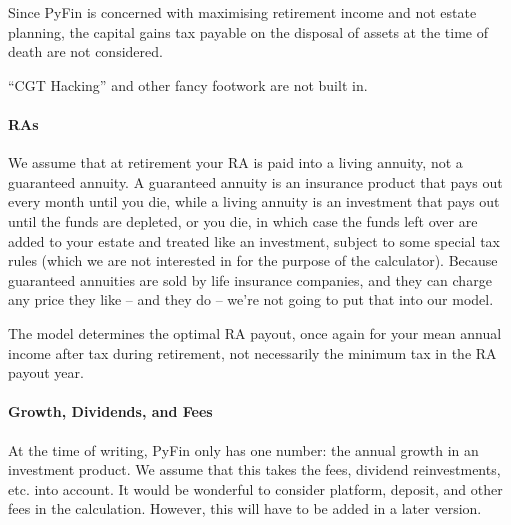 \documentclass[a4paper, justified]{tufte-handout}
\begin{document}
Since PyFin is concerned with maximising retirement income and not estate planning, the capital gains tax payable on the disposal of assets at the time of death are not considered.

``CGT Hacking'' and other fancy footwork are not built in.

\paragraph{RAs}
We assume that at retirement your RA is paid into a living annuity, not a guaranteed annuity. A guaranteed annuity is an insurance product that pays out every month until you die, while a living annuity is an investment that pays out until the funds are depleted, or you die, in which case the funds left over are added to your estate and treated like an investment, subject to some special tax rules (which we are not interested in for the purpose of the calculator). Because guaranteed annuities are sold by life insurance companies, and they can charge any price they like -- and they do -- we're not going to put that into our model.

The model determines the optimal RA payout, once again for your mean annual income after tax during retirement, not necessarily the minimum tax in the RA payout year.

\paragraph{Growth, Dividends, and Fees}
At the time of writing, PyFin only has one number: the annual growth in an investment product. We assume that this takes the fees, dividend reinvestments, etc. into account. It would be wonderful to consider platform, deposit, and other fees in the calculation. However, this will have to be added in a later version. 
\end{document}
